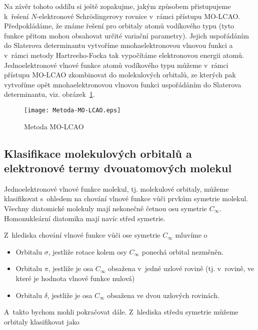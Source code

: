 Na závěr tohoto oddílu si ještě zopakujme, jakým způsobem přistupujeme k~řešení $N$-elektronové Schr\"odingerovy rovnice v~rámci přístupu MO-LCAO. Předpokládáme, že známe řešení pro orbitaly atomů vodíkového typu (tyto funkce přitom mohou obsahovat určité variační parametry). Jejich uspořádáním do Slaterova determinantu vytvoříme mnohaelektronovou vlnovou funkci a v~rámci metody Hartreeho-Focka tak vypočítáme elektronovou energii atomů. Jednoelektronové vlnové funkce atomů vodíkového typu můžeme v~rámci přístupu MO-LCAO zkombinovat do molekulových orbitalů, ze kterých pak vytvoříme opět mnohaelektronovou vlnovou funkci uspořádáním do Slaterova determinantu, viz. obrázek~\ref{obr:MOLCAO}.

\begin{figure} [htb]
\centering
\texttt{[image: Metoda-MO-LCAO.eps]}
\caption{Metoda MO-LCAO}
\label{obr:MOLCAO}
\end{figure}


\subsection{Klasifikace molekulových orbitalů a elektronové termy dvouatomových molekul}
 
Jednoelektronové vlnové funkce molekul, tj. molekulové orbitaly, můžeme klasifikovat s~ohledem na chování vlnové funkce vůči prvkům symetrie molekul. Všechny diatomické molekuly mají nekonečně četnou osu symetrie $C_\infty$. Homonukleární diatomika mají navíc střed symetrie.

Z~hlediska chování vlnové funkce vůči ose symetrie $C_\infty$ mluvíme o 

\begin{itemize}

\item Orbitalu $\sigma$, jestliže rotace kolem osy $C_\infty$ ponechá orbital nezměněn.

\item Orbitalu $\pi$, jestliže je osa $C_\infty$ obsažena v~jedné uzlové rovině (tj. v~rovině, ve které je hodnota vlnové funkce nulová)

\item Orbitalu $\delta$, jestliže je osa $C_\infty$ obsažena ve dvou uzlových rovinách. 

\end{itemize}

\noindent A~takto bychom mohli pokračovat dále. Z~hlediska středu symetrie můžeme orbitaly klasifikovat jako 

